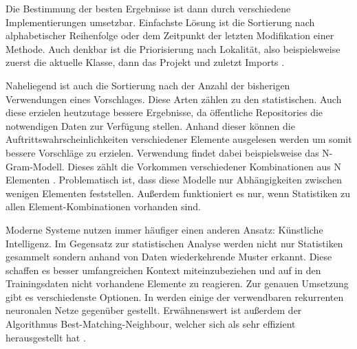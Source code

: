 Die Bestimmung der besten Ergebnisse ist dann durch verschiedene Implementierungen umsetzbar. Einfachste Lösung ist die Sortierung nach alphabetischer Reihenfolge oder dem Zeitpunkt der letzten Modifikation einer Methode. Auch denkbar ist die Priorisierung nach Lokalität, also beispielsweise zuerst die aktuelle Klasse, dann das Projekt und zuletzt Imports \cite{HobbesLanza2008}. 

Naheliegend ist auch die Sortierung nach der Anzahl der bisherigen Verwendungen eines Vorschlages. Diese Arten zählen zu den statistischen. Auch diese erzielen heutzutage bessere Ergebnisse, da öffentliche Repositories die notwendigen Daten zur Verfügung stellen. Anhand dieser können die Auftrittswahrscheinlichkeiten verschiedener Elemente ausgelesen werden um somit bessere Vorschläge zu erzielen. Verwendung findet dabei beispielsweise das N-Gram-Modell. Dieses zählt die Vorkommen verschiedener Kombinationen aus N Elementen \cite{Rosenfeld2000}. Problematisch ist, dass diese Modelle nur Abhängigkeiten zwischen wenigen Elementen feststellen. Außerdem funktioniert es nur, wenn Statistiken zu allen Element-Kombinationen vorhanden sind. 

Moderne Systeme nutzen immer häufiger einen anderen Ansatz: Künstliche Intelligenz. Im Gegensatz zur statistischen Analyse werden nicht nur Statistiken gesammelt sondern anhand von Daten wiederkehrende Muster erkannt. Diese schaffen es besser umfangreichen Kontext miteinzubeziehen und auf in den Trainingsdaten nicht vorhandene Elemente zu reagieren. Zur genauen Umsetzung gibt es verschiedenste Optionen. In \cite{Scharrenburg2019CodeCW} werden einige der verwendbaren rekurrenten neuronalen Netze gegenüber gestellt. Erwähnenswert ist außerdem der Algorithmus Best-Matching-Neighbour, welcher sich als sehr effizient herausgestellt hat \cite{BruchMonperrusMezini2009}.


